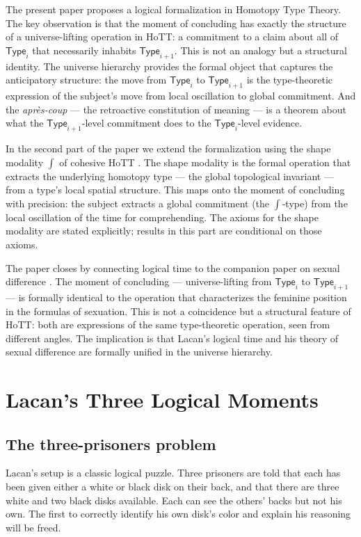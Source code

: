 \documentclass[12pt]{article}
\theoremstyle{definition}
\theoremstyle{remark}
\newcommand{\Type}[1]{\mathsf{Type}_{#1}}
\newcommand{\shapemod}{\int}                    %
\newcommand{\aprescoup}{\textit{apr\`es-coup}}
\begin{document}
The present paper proposes a logical formalization in Homotopy Type Theory. The key observation is that the moment of concluding has exactly the structure of a universe-lifting operation in HoTT: a commitment to a claim about all of $\Type{i}$ that necessarily inhabits $\Type{i+1}$. This is not an analogy but a structural identity. The universe hierarchy provides the formal object that captures the anticipatory structure: the move from $\Type{i}$ to $\Type{i+1}$ is the type-theoretic expression of the subject's move from local oscillation to global commitment. And the \aprescoup{} --- the retroactive constitution of meaning --- is a theorem about what the $\Type{i+1}$-level commitment does to the $\Type{i}$-level evidence.

In the second part of the paper we extend the formalization using the shape modality $\shapemod$ of cohesive HoTT \cite{shulman2018, corfield2020}. The shape modality is the formal operation that extracts the underlying homotopy type --- the global topological invariant --- from a type's local spatial structure. This maps onto the moment of concluding with precision: the subject extracts a global commitment (the $\shapemod$-type) from the local oscillation of the time for comprehending. The axioms for the shape modality are stated explicitly; results in this part are conditional on those axioms.

The paper closes by connecting logical time to the companion paper on sexual difference \cite{papathanasiou2026c}. The moment of concluding --- universe-lifting from $\Type{i}$ to $\Type{i+1}$ --- is formally identical to the operation that characterizes the feminine position in the formulas of sexuation. This is not a coincidence but a structural feature of HoTT: both are expressions of the same type-theoretic operation, seen from different angles. The implication is that Lacan's logical time and his theory of sexual difference are formally unified in the universe hierarchy.

\section{Lacan's Three Logical Moments}

\subsection{The three-prisoners problem}

Lacan's setup is a classic logical puzzle. Three prisoners are told that each has been given either a white or black disk on their back, and that there are three white and two black disks available. Each can see the others' backs but not his own. The first to correctly identify his own disk's color and explain his reasoning will be freed.
\end{document}
